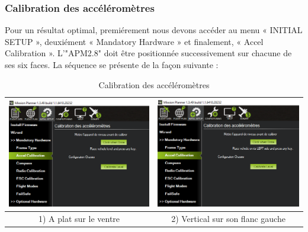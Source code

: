 	\subsubsection{Calibration des accéléromètres}
	Pour un résultat optimal,  premiérement nous devons accéder au menu « INITIAL SETUP », deuxiément « Mandatory Hardware » et finalement, « Accel Calibration ». L'"APM2.8" doit être positionnée successivement sur chacune de ses six faces.
	La séquence se présente de la façon suivante :
	
	\begin{table}[H]
		\begin{center}
			\caption{Calibration des accéléromètres  }
			
			\hspace*{-1.1 cm}	\begin{tabular}{|c|c|}
				\hline
				\centering
				\includegraphics[width=7.5cm]{Images/A plat sur le ventre} & \includegraphics[width=7.5cm]{Images/Vertical sur son flanc gauche}\\
				\hline
				\centering
				
				1) A plat sur le ventre & 2) Vertical sur son flanc gauche \\
				
				\hline
				

\end{tabular}
\end{center}
\end{table}

